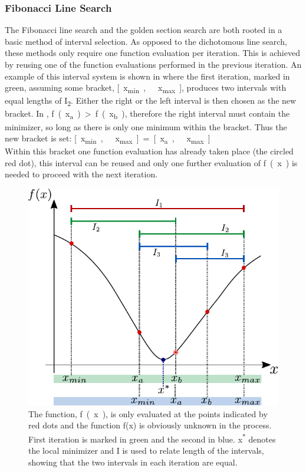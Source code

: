 \subsubsection{Fibonacci Line Search}
The Fibonacci line search and the golden section search are both rooted in a basic method of interval selection. As opposed to the dichotomous line search, these methods only require one function evaluation per iteration. This is achieved by reusing one of the function evaluations performed in the previous iteration. An example of this interval system is shown in  where the first iteration, marked in green, assuming some bracket, \si{[x_{min},\ x_{max}]}, produces two intervals with equal lengths of \si{I_2}. Either the right or the left interval is then chosen as the new bracket. In , \si{f(x_a) > f(x_b)}, therefore the right interval must contain the minimizer, so long as there is only one minimum within the bracket. Thus the new bracket is set: \si{[x_{min},\ x_{max}] = \si{[x_{a},\ x_{max}]}}\\
Within this bracket one function evaluation has already taken place (the circled red dot), this interval can be reused and only one further evaluation of \si{f(x)} is needed to proceed with the next iteration.

\begin{figure}[H] 
	\centering
	\includegraphics[width=.5\textwidth]{figures/fibonacciIntervalSystem}
	\caption{The function, \si{f(x)}, is only evaluated at the points indicated by red dots and the function f(x) is obviously unknown in the process. First iteration is marked in green and the second in blue. \si{x^*} denotes the local minimizer and \si{I} is used to relate length of the intervals, showing that the two intervals in each iteration are equal.}
	\label{fibonacciIntervalSystem}
\end{figure}

